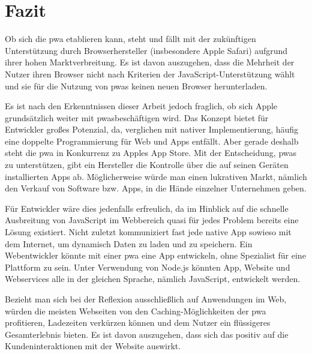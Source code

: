 \section{Fazit}

Ob sich die \ac{pwa} etablieren kann, steht und fällt mit der zukünftigen Unterstützung durch Browserhersteller (insbesondere Apple Safari) aufgrund ihrer hohen Marktverbreitung. Es ist davon auszugehen, dass die Mehrheit der Nutzer ihren Browser nicht nach Kriterien der JavaScript-Unterstützung wählt und sie für die Nutzung von \acp{pwa} keinen neuen Browser herunterladen.

Es ist nach den Erkenntnissen dieser Arbeit jedoch fraglich, ob sich Apple grundsätzlich weiter mit \acp{pwa}beschäftigen wird. Das Konzept bietet für Entwickler großes Potenzial, da, verglichen mit nativer Implementierung, häufig eine doppelte Programmierung für Web und Apps entfällt. Aber gerade deshalb steht die \ac{pwa} in Konkurrenz zu Apples App Store. Mit der Entscheidung, \acp{pwa} zu unterstützen, gibt ein Hersteller die Kontrolle über die auf seinen Geräten installierten Apps ab. 
Möglicherweise würde man einen lukrativen Markt, nämlich den Verkauf von Software bzw. Apps, in die Hände einzelner Unternehmen geben.

Für Entwickler wäre dies jedenfalls erfreulich, da im Hinblick auf die schnelle Ausbreitung von JavaScript im Webbereich quasi für jedes Problem bereits eine Lösung existiert. Nicht zuletzt kommuniziert fast jede native App sowieso mit dem Internet, um dynamisch Daten zu laden und zu speichern. Ein Webentwickler könnte mit einer \ac{pwa} eine App entwickeln, ohne Spezialist für eine Plattform zu sein. Unter Verwendung von Node.js könnten App, Website und Webservices alle in der gleichen Sprache, nämlich JavaScript, entwickelt werden.

Bezieht man sich bei der Reflexion ausschließlich auf Anwendungen im Web, würden die meisten Webseiten von den Caching-Möglichkeiten der \ac{pwa} profitieren, Ladezeiten verkürzen können und dem Nutzer ein flüssigeres Gesamterlebnis bieten. Es ist davon auszugehen, dass sich das positiv auf die Kundeninteraktionen mit der Website auswirkt.
